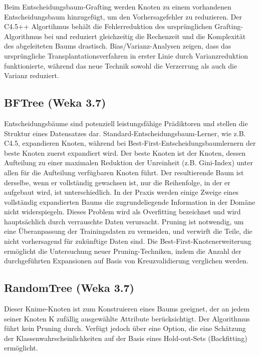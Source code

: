 \documentclass[12pt,					%
							 oneside,			%
							 a4paper,			%
							 halfparskip,		%
							 liststotoc,			%
							 bibtotoc,			%
							 fleqn,				%
							 pointlessnumbers]	%
							 {scrreprt}
\begin{document}
			Beim Entscheidungsbaum-Grafting werden Knoten zu einem vorhandenen Entscheidungsbaum hinzugefügt, um den Vorhersagefehler zu reduzieren. Der C4.5++ Algortihmus behält die Fehlerreduktion des ursprünglichen Grafting-Algorithmus bei und reduziert gleichzeitig die Rechenzeit und die Komplexität des abgeleiteten Baums drastisch. Bias/Varianz-Analysen zeigen, dass das ursprüngliche Transplantationsverfahren in erster Linie durch Varianzreduktion funktionierte, während das neue Technik sowohl die Verzerrung als auch die Varianz reduziert.\cite{Webb1999} 	
			
		\subsection{BFTree (Weka 3.7)}
			Entscheidungsbäume sind potenziell leistungsfähige Prädiktoren und stellen die Struktur eines Datensatzes dar. Standard-Entscheidungsbaum-Lerner, wie z.B. C4.5, expandieren Knoten, während bei Best-First-Entscheidungsbaumlernern der \glqq{}beste\grqq{} Knoten zuerst expandiert wird. Der \glqq{}beste\grqq{} Knoten ist der Knoten, dessen Aufteilung zu einer maximalen Reduktion der Unreinheit (z.B. Gini-Index) unter allen für die Aufteilung verfügbaren Knoten führt. Der resultierende Baum ist derselbe, wenn er vollständig gewachsen ist, nur die Reihenfolge, in der er aufgebaut wird, ist unterschiedlich. In der Praxis werden einige Zweige eines vollständig expandierten Baums die zugrundeliegende Information in der Domäne nicht widerspiegeln. Dieses Problem wird als Overfitting bezeichnet und wird hauptsächlich durch verrauschte Daten verursacht. Pruning ist notwendig, um eine Überanpassung der Trainingsdaten zu vermeiden, und verwirft die Teile, die nicht vorhersagend für zukünftige Daten sind. Die Best-First-Knotenerweiterung ermöglicht die Untersuchung neuer Pruning-Techniken, indem die Anzahl der durchgeführten Expansionen auf Basis von Kreuzvalidierung verglichen werden.\cite{Shi07}
			
			
		\subsection{RandomTree (Weka 3.7)}			
			Dieser Knime-Knoten ist zum Konstruieren eines Baums geeignet, der an jedem seiner Knoten K zufällig ausgewählte Attribute berücksichtigt. Der Algorithmus führt kein Pruning durch. Verfügt jedoch über eine Option, die eine Schätzung der Klassenwahrscheinlichkeiten auf der Basis eines Hold-out-Sets (Backfitting) ermöglicht.
			
\end{document}
